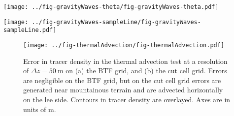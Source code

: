 \documentclass{ametsoc}
\begin{document}
\begin{figure*}
	\centering
	\texttt{[image: ../fig-gravityWaves-theta/fig-gravityWaves-theta.pdf]}
%
	\caption{Differences in potential temperature between the start and end of the gravity waves test on the BTF grid with $\Delta z = \SI{50}{\meter}$.  The dashed line at $x = \SI{50}{\kilo\meter}$ marks the position of the vertical profile in figure~\ref{fig:gw-sampleLine}.  Axes are in units of \si{\meter}.}
	\label{fig:gw-theta}
\end{figure*}

\begin{figure*}
	\centering
	\texttt{[image: ../fig-gravityWaves-sampleLine/fig-gravityWaves-sampleLine.pdf]}
%
	\caption{Vertical profiles of potential temperature differences between the start and end of the gravity waves test on (a) the BTF grid, and (b) the cut cell grid.  Results are compared with thermal advection tests results, showing differences in tracer density between the numeric and analytic solutions at $t = \SI{18000}{\second}$ on (c) the BTF grid, and (d) the cut cell grid.  The results are convergent, except for errors found in the lowest layers on the cut cell grids.}
	\label{fig:gw-sampleLine}
\end{figure*}

\begin{figure}
	\centering
	\texttt{[image: ../fig-thermalAdvection/fig-thermalAdvection.pdf]}
%
	\caption{Error in tracer density in the thermal advection test at a resolution of $\Delta z = \SI{50}{\meter}$ on (a) the BTF grid, and (b) the cut cell grid.  Errors are negligible on the BTF grid, but on the cut cell grid errors are generated near mountainous terrain and are advected horizontally on the lee side.  Contours in tracer density are overlayed.  Axes are in units of \si{\meter}.}
	\label{fig:thermalAdvection}
\end{figure}
\end{document}
